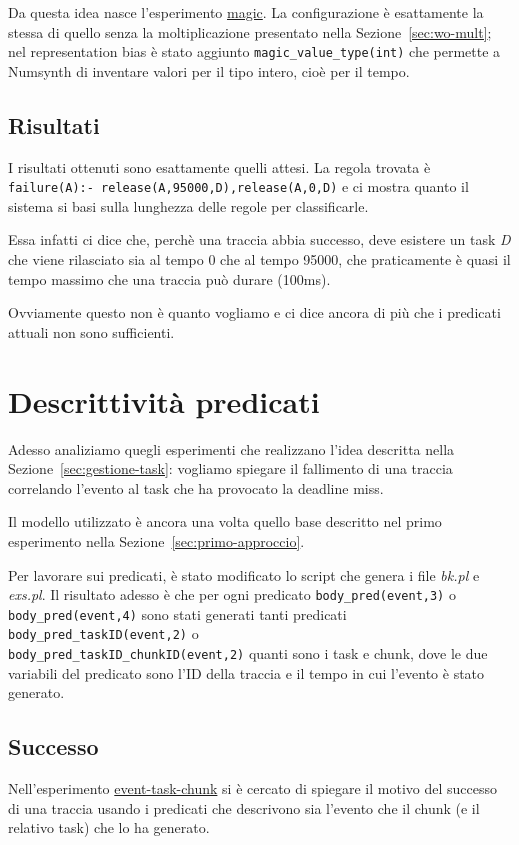 Da questa idea nasce l'esperimento \href{https://github.com/edoardosarri24/numsynth/tree/main/my-experiments/5-magic/}{magic}. La configurazione è esattamente la stessa di quello senza la moltiplicazione presentato nella Sezione~\ref{sec:wo-mult}; nel representation bias è stato aggiunto \texttt{magic\_value\_type(int)} che permette a Numsynth di inventare valori per il tipo intero, cioè per il tempo.

\subsection{Risultati}
I risultati ottenuti sono esattamente quelli attesi. La regola trovata è \texttt{failure(A):- release(A,95000,D),release(A,0,D)} e ci mostra quanto il sistema si basi sulla lunghezza delle regole per classificarle.

Essa infatti ci dice che, perchè una traccia abbia successo, deve esistere un task \textit{D} che viene rilasciato sia al tempo 0 che al tempo 95000, che praticamente è quasi il tempo massimo che una traccia può durare (100ms).

Ovviamente questo non è quanto vogliamo e ci dice ancora di più che i predicati attuali non sono sufficienti.

\section{Descrittività predicati}
\label{sec:event_task_chunk}
Adesso analiziamo quegli esperimenti che realizzano l'idea descritta nella Sezione~\ref{sec:gestione-task}: vogliamo spiegare il fallimento di una traccia correlando l'evento al task che ha provocato la deadline miss.

Il modello utilizzato è ancora una volta quello base descritto nel primo esperimento nella Sezione~\ref{sec:primo-approccio}.

\myskip

Per lavorare sui predicati, è stato modificato lo script che genera i file \textit{bk.pl} e \textit{exs.pl}. Il risultato adesso è che per ogni predicato \texttt{body\_pred(event,3)} o \texttt{body\_pred(event,4)} sono stati generati tanti predicati \texttt{body\_pred\_taskID(event,2)} o \\ \texttt{body\_pred\_taskID\_chunkID(event,2)} quanti sono i task e chunk, dove le due variabili del predicato sono l'ID della traccia e il tempo in cui l'evento è stato generato.

\subsection{Successo}
Nell'esperimento \href{https://github.com/edoardosarri24/prediction-in-data-driven-system/tree/main/my-experiments/6-event-task-chunk}{event-task-chunk} si è cercato di spiegare il motivo del successo di una traccia usando i predicati che descrivono sia l'evento che il chunk (e il relativo task) che lo ha generato.

